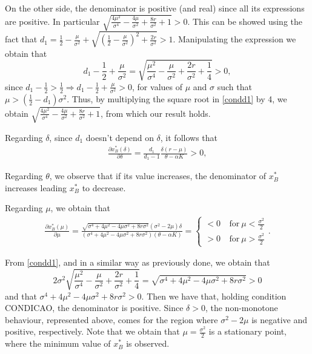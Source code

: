 On the other side, the denominator is positive (and real) since all its expressions are positive. In particular $\sqrt{\frac{4 \mu ^2}{\sigma ^4}-\frac{4 \mu }{\sigma ^2}+\frac{8 r}{\sigma ^2}+1}>0$.
This can be showed using the fact that $d_1=\frac{1}{2}-\frac{\mu}{\sigma^2} +\sqrt{\left( \frac{1}{2} -\frac{\mu}{\sigma^2} \right) ^2+ \frac{2r}{\sigma^2}}>1$. Manipulating the expression we obtain that
\begin{equation}
 d_1-\frac{1}{2}+\frac{\mu}{\sigma^2}= \sqrt{ \frac{\mu^2}{\sigma^4}-\frac{\mu}{\sigma^2} +\frac{2r}{\sigma^2}+\frac{1}{4} }>0,
 \label{condd1}
\end{equation}
 since $d_1-\frac{1}{2}>\frac{1}{2} \Rightarrow d_1-\frac{1}{2}+\frac{\mu}{\sigma^2}>0$, for values of $\mu$ and $\sigma$ such that $\mu>\left( \frac{1}{2}-d_1 \right) \sigma^2$. Thus, by multiplying the square root in \eqref{condd1} by 4, we obtain  $\sqrt{\frac{4 \mu ^2}{\sigma ^4}-\frac{4 \mu }{\sigma ^2}+\frac{8 r}{\sigma ^2}+1}$, from which our result holds.
 
 
 Regarding $\delta$, since $d_1$ doesn't depend on $\delta$, it follows that
 \begin{align*}
 \frac{\partial x^*_B (\delta)}{\partial \delta}= \frac{d_1}{d_1-1} \frac{\delta (r-\mu)}{\theta-\alpha K}>0,
 \end{align*}
 
 
 Regarding $\theta$, we observe that if its value increases, the denominator of $x^*_B$ increases leading $x^*_B$ to decrease.
 
 Regarding $\mu$, we obtain that
 \begin{align*}
 \frac{\partial x^*_B (\mu)}{\partial \mu}=\frac{\sqrt{\sigma^4+4 \mu^2 -4 \mu\sigma^2+8r\sigma^2}(\sigma^2-2\mu)\delta}{(\sigma^4+4 \mu^2 -4 \mu\sigma^2+8r\sigma^2)(\theta-\alpha K )} =
 \begin{cases}
 <0 &\ \text{for} \ \mu<\frac{\sigma^2}{2}\\
 >0 &\ \text{for} \ \mu>\frac{\sigma^2}{2}
 \end{cases}.
 \end{align*}
 
 From \eqref{condd1}, and in a similar way as previously done, we obtain that
 $$2 \sigma^2 \sqrt{ \frac{\mu^2}{\sigma^4}-\frac{\mu}{\sigma^2} +\frac{2r}{\sigma^2}+\frac{1}{4} }= \sqrt{ \sigma^4+4 \mu^2 -4 \mu\sigma^2+8r\sigma^2}>0$$
 and that $\sigma^4+4 \mu^2 -4 \mu\sigma^2+8r\sigma^2>0$. Then we have that, holding condition CONDICAO, the denominator is positive. Since $\delta>0$, the non-monotone behaviour, represented above, comes for the region where $\sigma^2-2\mu$ is negative and positive, respectively. Note that we obtain that $\mu=\frac{\sigma^2}{2}$ is a stationary point, where the minimum value of $x^*_B$ is observed.
 
